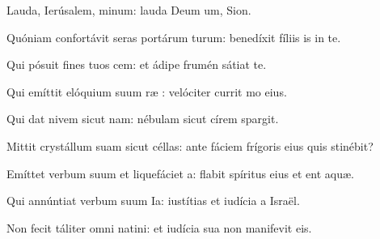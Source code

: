 \item {}

\item Lauda, Ierúsalem, minum:\psstar{} lauda Deum um, Sion.

\item Quóniam confortávit seras portárum turum:\psstar{} benedíxit fíliis is in te.

\item Qui pósuit fines tuos cem:\psstar{} et ádipe frumén sátiat te.

\item Qui emíttit elóquium suum ræ :\psstar{} velóciter currit mo eius.

\item Qui dat nivem sicut nam:\psstar{} nébulam sicut círem spargit.

\item Mittit crystállum suam sicut céllas:\psstar{} ante fáciem frígoris eius quis stinébit?

\item Emíttet verbum suum et liquefáciet a:\psstar{} flabit spíritus eius et ent aquæ.

\item Qui annúntiat verbum suum Ia:\psstar{} iustítias et iudícia a Israël.

\item Non fecit táliter omni natini:\psstar{} et iudícia sua non manifevit eis.
